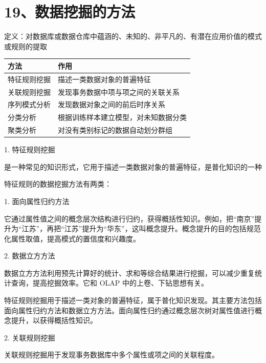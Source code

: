 \documentclass[UTF8,zihao=-4]{ctexart}
\begin{document}
\newpage
\section*{19、数据挖掘的方法}

定义：对数据库或数据仓库中蕴涵的、未知的、非平凡的、有潜在应用价值的模式或规则的提取\par

\begin{tabularx}{\linewidth}{|*{2}{>{\RaggedRight\arraybackslash}X|}}
\hline
方法 & 作用 \\
\hline
特征规则挖掘 & 描述一类数据对象的普遍特征 \\
\hline
关联规则挖掘 & 发现事务数据中项与项之间的关联关系 \\
\hline
序列模式分析 & 发现数据对象之间的前后时序关系 \\
\hline
分类分析 & 根据训练样本建立模型，对未知数据分类 \\
\hline
聚类分析 & 对没有类别标记的数据自动划分群组 \\
\hline
\end{tabularx}

1. 特征规则挖掘\par
是一种常见的知识形式，它用于描述一类数据对象的普遍特征，是普化知识的一种\par

特征规则的数据挖掘方法有两类：\par

1. 面向属性归约方法\par

它通过属性值之间的概念层次结构进行归约，获得概括性知识。例如，把“南京”提升为“江苏”，再把“江苏”提升为“华东”，这叫概念提升。概念提升的目的包括规范化属性取值，提高模式的置信度和兴趣度。\par

2. 数据立方方法\par

数据立方方法利用预先计算好的统计、求和等综合结果进行挖掘，可以减少重复统计查询，提高挖掘效率。它和 OLAP 中的上卷、下钻思想有关。\par

特征规则挖掘用于描述一类对象的普遍特征，属于普化知识发现。其主要方法包括面向属性归约方法和数据立方方法。面向属性归约通过概念层次树对属性值进行概念提升，以获得概括性知识。\par

2. 关联规则挖掘\par

关联规则挖掘用于发现事务数据库中多个属性或项之间的关联程度。\par
\end{document}
